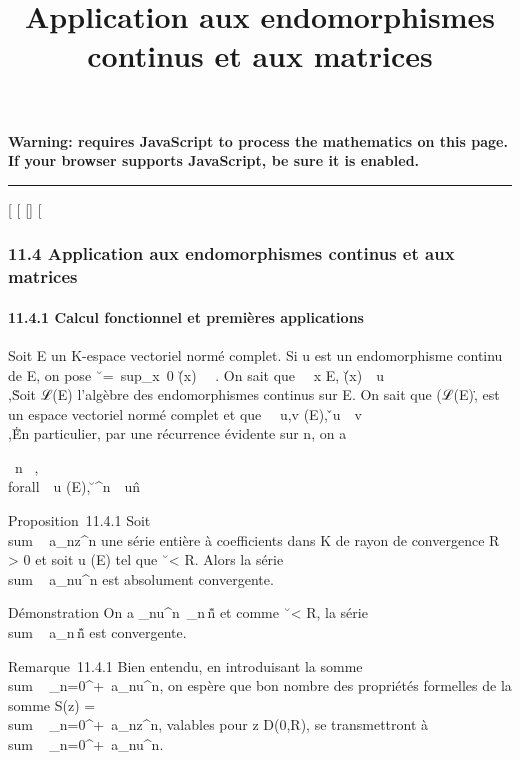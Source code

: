 \documentclass[]{article}
\title{Application aux endomorphismes continus et aux matrices}
\author{}
\date{}
\begin{document}
\maketitle

\textbf{Warning: 
requires JavaScript to process the mathematics on this page.\\ If your
browser supports JavaScript, be sure it is enabled.}

\begin{center}\rule{3in}{0.4pt}\end{center}

{[}
{[}
{[}{]}
{[}

\subsubsection{11.4 Application aux endomorphismes continus et aux
matrices}

\paragraph{11.4.1 Calcul fonctionnel et premières applications}

Soit E un K-espace vectoriel normé complet. Si u est un endomorphisme
continu de E, on pose
\u\
=\
sup_x\neq~0
\u(x)\
\over
\x\ . On sait que
\forall~~x \in E,
\u(x)\
\leq\
u\\,\x\.
Soit ℒ(E) l'algèbre des endomorphismes continus sur E. On sait que
(ℒ(E),\.\) est un
espace vectoriel normé complet et que \forall~~u,v
\inℒ(E), \v \cdot u\
\leq\
v\\,\u\.
En particulier, par une récurrence évidente sur n, on a

\forall~n \in {}~, \\forall~~u (E),
\u^n\
\leq\ u\^n

Proposition~11.4.1 Soit
\\sum ~
a_nz^n une série entière à coefficients dans K de
rayon de convergence R \textgreater{} 0 et soit u (E) tel que
\u\ \textless{} R.
Alors la série \\sum ~
a_nu^n est absolument convergente.

Démonstration On a
\a_nu^n\
\leqa_n\,\u\^n
et comme \u\
\textless{} R, la série
\\sum ~
a_n\,\u\^n
est convergente.

Remarque~11.4.1 Bien entendu, en introduisant la somme
\\sum ~
_n=0^+\infty~a_nu^n, on espère que bon
nombre des propriétés formelles de la somme S(z)
= \\sum ~
_n=0^+\infty~a_nz^n, valables pour z \in
D(0,R), se transmettront à
\\sum ~
_n=0^+\infty~a_nu^n.
\end{document}
